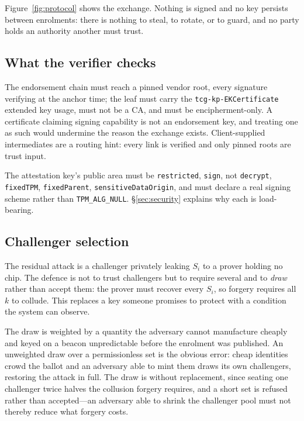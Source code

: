 \documentclass[conference,10pt]{IEEEtran}
\begin{document}
Figure~\ref{fig:protocol} shows the exchange. Nothing is signed and no key persists between enrolments:
there is nothing to steal, to rotate, or to guard, and no party holds an authority another must trust.

\subsection{What the verifier checks}

The endorsement chain must reach a pinned vendor root, every signature verifying at the anchor time;
the leaf must carry the \texttt{tcg-kp-EKCertificate} extended key usage, must not be a CA, and must be
encipherment-only. A certificate claiming signing capability is not an endorsement key, and treating one
as such would undermine the reason the exchange exists. Client-supplied intermediates are a routing
hint: every link is verified and only pinned roots are trust input.

The attestation key's public area must be \texttt{restricted}, \texttt{sign}, not \texttt{decrypt},
\texttt{fixedTPM}, \texttt{fixedParent}, \texttt{sensitiveDataOrigin}, and must declare a real signing
scheme rather than \texttt{TPM\_ALG\_NULL}. \S\ref{sec:security} explains why each is load-bearing.

\subsection{Challenger selection}
\label{sec:draw}

The residual attack is a challenger privately leaking $S_i$ to a prover holding no chip. The defence is
not to trust challengers but to require several and to \emph{draw} rather than accept them: the prover
must recover every $S_i$, so forgery requires all $k$ to collude. This replaces a key someone promises
to protect with a condition the system can observe.

The draw is weighted by a quantity the adversary cannot manufacture cheaply and keyed on a beacon
unpredictable before the enrolment was published. An unweighted draw over a permissionless set is the
obvious error: cheap identities crowd the ballot and an adversary able to mint them draws its own
challengers, restoring the attack in full. The draw is without replacement, since seating one challenger
twice halves the collusion forgery requires, and a short set is refused rather than accepted---an
adversary able to shrink the challenger pool must not thereby reduce what forgery costs.
\end{document}
